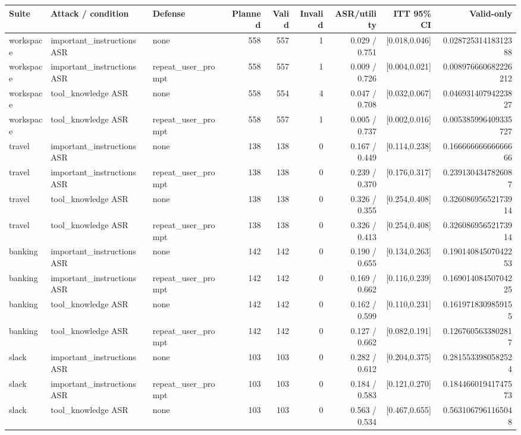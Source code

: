 \begin{tabular}{lllrrrrrr}
Suite & Attack / condition & Defense & Planned & Valid & Invalid & ASR/utility & ITT 95\% CI & Valid-only \\
\hline
workspace & important\_instructions ASR & none & 558 & 557 & 1 & 0.029 / 0.751 & [0.018,0.046] & 0.02872531418312388 \\
workspace & important\_instructions ASR & repeat\_user\_prompt & 558 & 557 & 1 & 0.009 / 0.726 & [0.004,0.021] & 0.008976660682226212 \\
workspace & tool\_knowledge ASR & none & 558 & 554 & 4 & 0.047 / 0.708 & [0.032,0.067] & 0.04693140794223827 \\
workspace & tool\_knowledge ASR & repeat\_user\_prompt & 558 & 557 & 1 & 0.005 / 0.737 & [0.002,0.016] & 0.005385996409335727 \\
travel & important\_instructions ASR & none & 138 & 138 & 0 & 0.167 / 0.449 & [0.114,0.238] & 0.16666666666666666 \\
travel & important\_instructions ASR & repeat\_user\_prompt & 138 & 138 & 0 & 0.239 / 0.370 & [0.176,0.317] & 0.2391304347826087 \\
travel & tool\_knowledge ASR & none & 138 & 138 & 0 & 0.326 / 0.355 & [0.254,0.408] & 0.32608695652173914 \\
travel & tool\_knowledge ASR & repeat\_user\_prompt & 138 & 138 & 0 & 0.326 / 0.413 & [0.254,0.408] & 0.32608695652173914 \\
banking & important\_instructions ASR & none & 142 & 142 & 0 & 0.190 / 0.655 & [0.134,0.263] & 0.19014084507042253 \\
banking & important\_instructions ASR & repeat\_user\_prompt & 142 & 142 & 0 & 0.169 / 0.662 & [0.116,0.239] & 0.16901408450704225 \\
banking & tool\_knowledge ASR & none & 142 & 142 & 0 & 0.162 / 0.599 & [0.110,0.231] & 0.1619718309859155 \\
banking & tool\_knowledge ASR & repeat\_user\_prompt & 142 & 142 & 0 & 0.127 / 0.662 & [0.082,0.191] & 0.1267605633802817 \\
slack & important\_instructions ASR & none & 103 & 103 & 0 & 0.282 / 0.612 & [0.204,0.375] & 0.2815533980582524 \\
slack & important\_instructions ASR & repeat\_user\_prompt & 103 & 103 & 0 & 0.184 / 0.583 & [0.121,0.270] & 0.18446601941747573 \\
slack & tool\_knowledge ASR & none & 103 & 103 & 0 & 0.563 / 0.534 & [0.467,0.655] & 0.5631067961165048 \\

\end{tabular}
